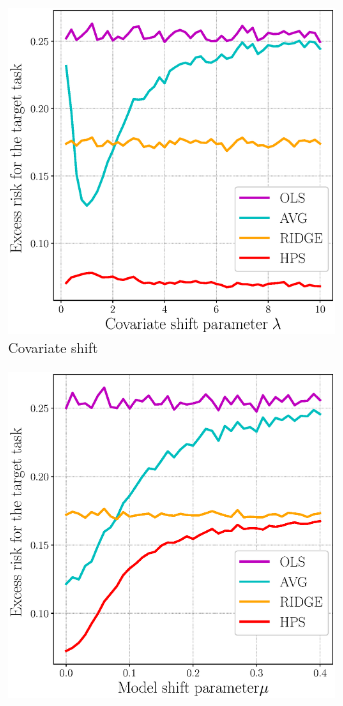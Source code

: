 \begin{figure}[!t]
	\begin{subfigure}[b]{0.33\textwidth}
		\centering
		\includegraphics[width=0.95\textwidth]{figures/compare_risk_covariate_shift.eps}
		\caption{Covariate shift}
		\label{fig_sec5_covariate}
	\end{subfigure}\hfill%
	\begin{subfigure}[b]{0.33\textwidth}
		\centering
		\includegraphics[width=0.95\textwidth]{figures/compare_risk_model_shift.eps}

\end{subfigure}
\end{figure}
